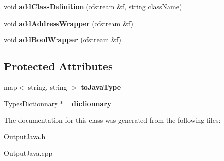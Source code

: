 \begin{DoxyCompactItemize}
\item 
\hypertarget{classnsJNI_1_1OutputJava_a8f5300d416959c779ce94b3de386d7ab}{void {\bfseries add\-Class\-Definition} (ofstream \&f, string class\-Name)}\label{classnsJNI_1_1OutputJava_a8f5300d416959c779ce94b3de386d7ab}

\item 
\hypertarget{classnsJNI_1_1OutputJava_a4f6c0e697fd31e91ef039f7785389416}{void {\bfseries add\-Address\-Wrapper} (ofstream \&f)}\label{classnsJNI_1_1OutputJava_a4f6c0e697fd31e91ef039f7785389416}

\item 
\hypertarget{classnsJNI_1_1OutputJava_aa59419aa21b2267348941a0491eb487d}{void {\bfseries add\-Bool\-Wrapper} (ofstream \&f)}\label{classnsJNI_1_1OutputJava_aa59419aa21b2267348941a0491eb487d}

\end{DoxyCompactItemize}
\subsection*{\-Protected \-Attributes}
\begin{DoxyCompactItemize}
\item 
\hypertarget{classnsJNI_1_1OutputJava_a465f5bb7c53bd71e6908de54912e68e2}{map$<$ string, string $>$ {\bfseries to\-Java\-Type}}\label{classnsJNI_1_1OutputJava_a465f5bb7c53bd71e6908de54912e68e2}

\item 
\hypertarget{classnsJNI_1_1OutputJava_a946021e818a9ac9d18157ef2a3a78693}{\hyperlink{classnsJNI_1_1TypesDictionnary}{\-Types\-Dictionnary} $\ast$ {\bfseries \-\_\-dictionnary}}\label{classnsJNI_1_1OutputJava_a946021e818a9ac9d18157ef2a3a78693}

\end{DoxyCompactItemize}


\-The documentation for this class was generated from the following files\-:\begin{DoxyCompactItemize}
\item 
\-Output\-Java.\-h\item 
\-Output\-Java.\-cpp\end{DoxyCompactItemize}
